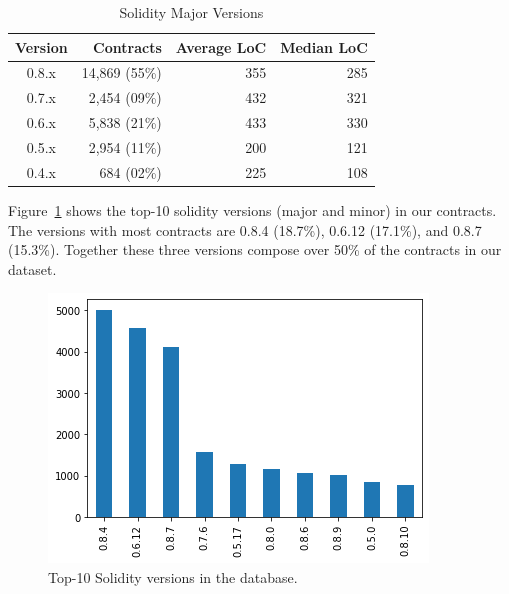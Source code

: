 \documentclass[10pt,conference]{IEEEtran}
\begin{document}
\begin{table}
\center
  \caption{Solidity Major Versions}
  \label{tab:major-versions}
  \begin{tabular}{crrr}
    \hline
    Version & Contracts & Average LoC & Median LoC \\
    \hline
    0.8.x & 14,869 (55\%) & 355 & 285 \\
    0.7.x & 2,454 (09\%) & 432 & 321 \\
    0.6.x & 5,838 (21\%) & 433 & 330 \\
    0.5.x & 2,954 (11\%) & 200 & 121 \\
    0.4.x & 684  (02\%) & 225 & 108 \\
  \hline
\end{tabular}
\end{table}

Figure~\ref{fig:minor-versions} shows the top-10 solidity versions (major and minor) in our contracts. The versions with most contracts are 0.8.4 (18.7\%), 0.6.12 (17.1\%), and 0.8.7 (15.3\%). Together these three versions compose over 50\% of the contracts in our dataset.

\begin{figure}[h]
  \centering
  \includegraphics[width=\linewidth]{img/versions_clean.png}
  \caption{Top-10 Solidity versions in the database.}
  \label{fig:minor-versions}
\end{figure}
\end{document}
